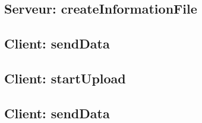 \documentclass[11pt]{beamer}
\begin{document}
		\begin{frame}
			
		\end{frame}

		\begin{frame}
			
		\end{frame}

		\begin{frame}
			
		\end{frame}

		\begin{frame}
			
		\end{frame}

		\begin{frame}
			
		\end{frame}

		\begin{frame}
			
		\end{frame}

	\subsection*{Serveur: createInformationFile}

		\begin{frame}
			
		\end{frame}

		\begin{frame}
			
		\end{frame}

	\subsection*{Client: sendData}
	
		\begin{frame}
			
		\end{frame}

	\subsection*{Client: startUpload}
	
		\begin{frame}
			
		\end{frame}

	\subsection*{Client: sendData}
	
\end{document}

